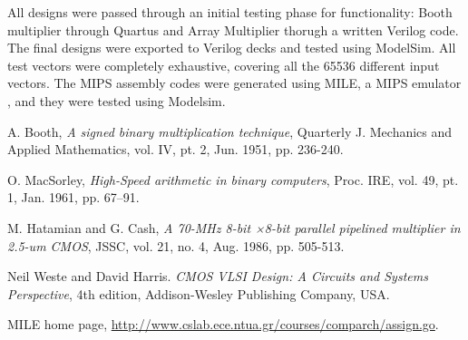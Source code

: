 \documentclass[journal]{IEEEtran}
\begin{document}
All designs were passed through an initial testing phase for functionality: 
Booth multiplier through Quartus and Array Multiplier thorugh a written Verilog code. 
The final designs were exported to Verilog decks and tested using ModelSim. 
All test vectors were completely exhaustive, covering all the 65536 different input vectors.
The MIPS assembly codes were generated using MILE, a MIPS emulator \cite{mile}, 
and they were tested using Modelsim.



\begin{thebibliography}{1}


A. Booth, \emph{A signed binary multiplication technique}, Quarterly J. 
Mechanics and Applied Mathematics, vol. IV, pt. 2, Jun. 1951, pp. 236-240.

O. MacSorley, \emph{High-Speed arithmetic in binary computers}, Proc. IRE, 
vol. 49, pt. 1, Jan. 1961, pp. 67–91.

M. Hatamian and G. Cash, \emph{A 70-MHz 8-bit ×8-bit parallel pipelined 
multiplier in 2.5-um CMOS}, 
JSSC, vol. 21, no. 4, Aug. 1986, pp. 505-513.

Neil Weste and David Harris. \emph{CMOS VLSI Design: A Circuits and 
Systems Perspective}, 4th edition, Addison-Wesley Publishing Company, 
USA.

 MILE home page,
\href{http://www.cslab.ece.ntua.gr/courses/comparch/assign.go}{http://www.cslab.ece.ntua.gr/courses/comparch/assign.go}.


\end{thebibliography}




\end{document}
